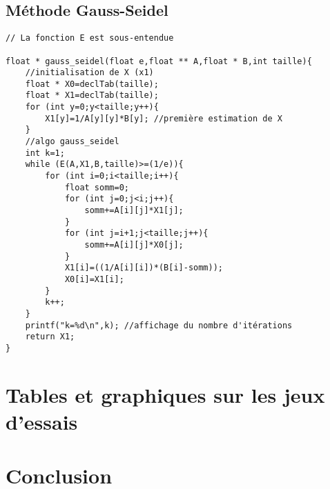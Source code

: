 \documentclass[10pt,a4paper,french]{article}
\begin{document}
\subsection{Méthode Gauss-Seidel}
\begin{lstlisting}
// La fonction E est sous-entendue

float * gauss_seidel(float e,float ** A,float * B,int taille){
    //initialisation de X (x1)
    float * X0=declTab(taille);
    float * X1=declTab(taille);
    for (int y=0;y<taille;y++){
        X1[y]=1/A[y][y]*B[y]; //première estimation de X 
    }
    //algo gauss_seidel
    int k=1;
    while (E(A,X1,B,taille)>=(1/e)){
        for (int i=0;i<taille;i++){
            float somm=0;
            for (int j=0;j<i;j++){
                somm+=A[i][j]*X1[j];
            }
            for (int j=i+1;j<taille;j++){
                somm+=A[i][j]*X0[j];
            }
            X1[i]=((1/A[i][i])*(B[i]-somm));
            X0[i]=X1[i];
        }
        k++;
    }
    printf("k=%d\n",k); //affichage du nombre d'itérations
    return X1;
}
\end{lstlisting}
\section{Tables et graphiques sur les jeux d'essais}
\section{Conclusion}
\end{document}

